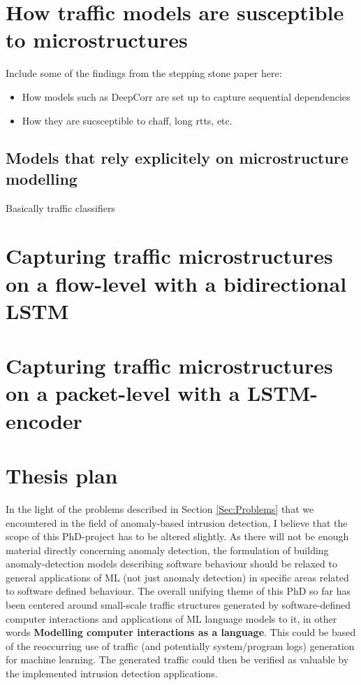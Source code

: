 \documentclass[a4paper,12pt,twoside]{article}
\begin{document}
\section{How traffic models are susceptible to microstructures}

Include some of the findings from the stepping stone paper here:

\begin{itemize}
\item How models such as DeepCorr are set up to capture sequential dependencies
\item How they are sucsceptible to chaff, long rtts, etc.
\end{itemize}

\subsection{Models that rely explicitely on microstructure modelling}
Basically traffic classifiers




\section{Capturing traffic microstructures on a flow-level with a bidirectional LSTM}

\section{Capturing traffic microstructures on a packet-level with a LSTM-encoder}



\section{Thesis plan}

In the light of the problems described in Section \ref{Sec:Problems} that we encountered in the field of anomaly-based intrusion detection, I believe that the scope of this PhD-project has to be altered slightly. As there will not be enough material directly concerning anomaly detection, the formulation of building anomaly-detection models describing software behaviour should be relaxed to general applications of ML (not just anomaly detection) in specific areas related to software defined behaviour. 
The overall unifying theme of this PhD so far has been centered around small-scale traffic structures generated by software-defined computer interactions and applications of ML language models to it, in other words \textbf{Modelling computer interactions as a language}.
This could be based of the reoccurring use of traffic (and potentially system/program logs) generation for machine learning. The generated traffic could then be verified as valuable by the implemented intrusion detection applications.
\end{document}
